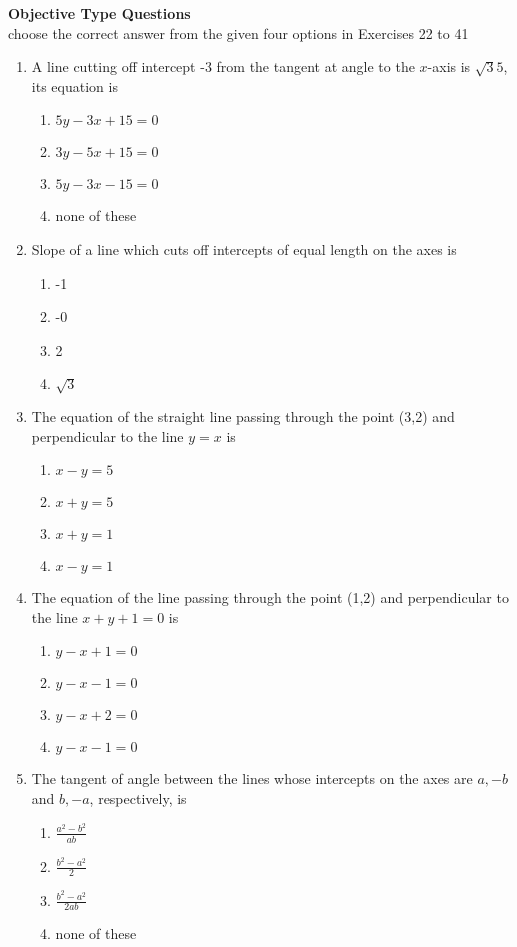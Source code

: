 \textbf{Objective Type Questions}\\
choose the correct answer from the given four options in Exercises 22 to 41
\begin{enumerate}[resume]
\item A line cutting off intercept -3 from the tangent at angle to the $x$-axis is $\sqrt{3}{5}$, its equation is
\begin{enumerate}
\item $5y-3x+15=0$
\item $3y-5x+15=0$
\item $5y-3x-15=0$
\item none of these
\end{enumerate}
\item Slope of a line which cuts off intercepts of equal length on the axes is 
\begin{enumerate}
\item -1
\item -0
\item 2
\item $\sqrt{3}$
\end{enumerate}
\item The equation of the straight line passing through the point (3,2) and perpendicular to the line $y=x$ is
\begin{enumerate}
\item $x-y=5$
\item $x+y=5$
\item $x+y=1$
\item $x-y=1$
\end{enumerate}
\item The equation of the line passing through the point (1,2) and perpendicular to the line $x+y+1=0$ is
\begin {enumerate}
\item $y-x+1=0$
\item $y-x-1=0$
\item $y-x+2=0$
\item $y-x-1=0$
\end{enumerate}
\item The tangent of angle between the lines whose intercepts on the axes are $a,-b$ and $b,-a$, respectively, is
\begin{enumerate}
\item $\frac{a^2-b^2}{ab}$
\item $\frac{b^2-a^2}{2}$
\item $\frac{b^2-a^2}{2ab}$
\item none of these 

\end{enumerate}
\end{enumerate}
